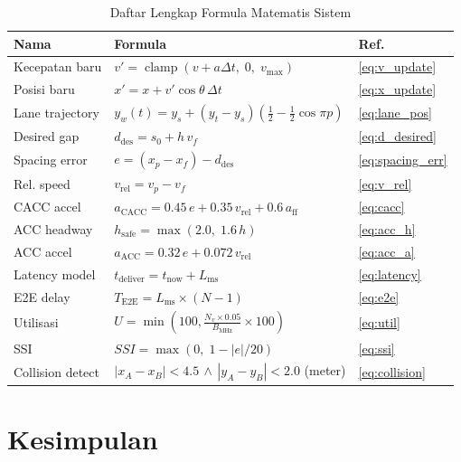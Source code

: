 \documentclass[12pt,a4paper]{article}
\begin{document}
\begin{table}[ht]
\centering
\caption{Daftar Lengkap Formula Matematis Sistem}
\begin{tabularx}{\linewidth}{lXl}
\toprule
\textbf{Nama} & \textbf{Formula} & \textbf{Ref.} \\
\midrule
Kecepatan baru & $v' = \operatorname{clamp}(v + a\Delta t,\; 0,\; v_{\max})$ & \ref{eq:v_update} \\[0.3em]
Posisi baru & $x' = x + v'\cos\theta\,\Delta t$ & \ref{eq:x_update} \\[0.3em]
Lane trajectory & $y_w(t) = y_s + (y_t - y_s)\!\left(\tfrac{1}{2}-\tfrac{1}{2}\cos\pi p\right)$ & \ref{eq:lane_pos} \\[0.3em]
Desired gap & $d_{\text{des}} = s_0 + h\, v_f$ & \ref{eq:d_desired} \\[0.3em]
Spacing error & $e = (x_p - x_f) - d_{\text{des}}$ & \ref{eq:spacing_err} \\[0.3em]
Rel. speed & $v_{\text{rel}} = v_p - v_f$ & \ref{eq:v_rel} \\[0.3em]
CACC accel & $a_{\text{CACC}} = 0.45\,e + 0.35\,v_{\text{rel}} + 0.6\,a_{\text{ff}}$ & \ref{eq:cacc} \\[0.3em]
ACC headway & $h_{\text{safe}} = \max(2.0,\; 1.6\,h)$ & \ref{eq:acc_h} \\[0.3em]
ACC accel & $a_{\text{ACC}} = 0.32\,e + 0.072\,v_{\text{rel}}$ & \ref{eq:acc_a} \\[0.3em]
Latency model & $t_{\text{deliver}} = t_{\text{now}} + L_{\text{ms}}$ & \ref{eq:latency} \\[0.3em]
E2E delay & $T_{\text{E2E}} = L_{\text{ms}} \times (N-1)$ & \ref{eq:e2e} \\[0.3em]
Utilisasi & $U = \min\!\left(100,\frac{N_v \times 0.05}{B_{\text{MHz}}}\times 100\right)$ & \ref{eq:util} \\[0.3em]
SSI & $SSI = \max\!\left(0,\; 1 - |e|/20\right)$ & \ref{eq:ssi} \\[0.3em]
Collision detect & $|x_A{-}x_B| < 4.5\,\wedge\,|y_A{-}y_B| < 2.0$ (meter) & \ref{eq:collision} \\
\bottomrule
\end{tabularx}
\end{table}

\section{Kesimpulan}
\end{document}
